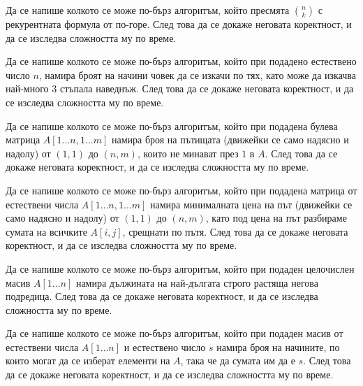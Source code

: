 \begin{problem}
Да се напише колкото се може по-бърз алгоритъм, който пресмята ${n \choose k}$ с рекурентната формула от по-горе.
След това да се докаже неговата коректност, и да се изследва сложността му по време.
\end{problem}

\begin{problem}
Да се напише колкото се може по-бърз алгоритъм, който при подадено естествено число $n$, намира броят на начини човек да се изкачи по тях, като може да изкачва най-много $3$ стъпала наведнъж.
След това да се докаже неговата коректност, и да се изследва сложността му по време.
\end{problem}

\begin{problem}
Да се напише колкото се може по-бърз алгоритъм, който при подадена булева матрица $A[1 \dots n, 1 \dots m]$ намира броя на пътищата (движейки се само надясно и надолу) от $(1, 1)$ до $(n, m)$, които не минават през $1$ в $A$.
След това да се докаже неговата коректност, и да се изследва сложността му по време.
\end{problem}

\begin{problem}
Да се напише колкото се може по-бърз алгоритъм, който при подадена матрица от естествени числа $A[1 \dots n, 1 \dots m]$ намира минималната цена на път (движейки се само надясно и надолу) от $(1, 1)$ до $(n, m)$, като под цена на път разбираме сумата на всичките $A[i, j]$, срещнати по пътя.
След това да се докаже неговата коректност, и да се изследва сложността му по време.
\end{problem}


\begin{problem}
Да се напише колкото се може по-бърз алгоритъм, който при подаден целочислен масив $A[1 \dots n]$ намира дължината на най-дългата строго растяща негова подредица.
След това да се докаже неговата коректност, и да се изследва сложността му по време.
\end{problem}

\begin{problem}
Да се напише колкото се може по-бърз алгоритъм, който при подаден масив от естествени числа $A[1 \dots n]$ и естествено число $s$ намира броя на начините, по които могат да се изберат елементи на $A$, така че да сумата им да е $s$.
След това да се докаже неговата коректност, и да се изследва сложността му по време.
\end{problem}

